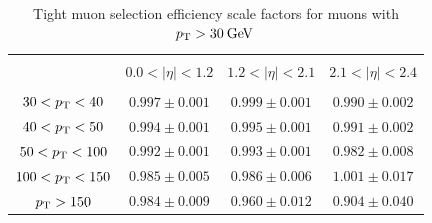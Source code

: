  \begin{table}[!ht]
 \centering
 \begin{tabular}{|c|c|c|c|}
 \hline
 &                          &                              &                           \\
 & $0.0 < |\eta| < 1.2$ & $1.2 < |\eta| < 2.1$ & $2.1 < |\eta| < 2.4$ \\
  &                          &                              &                           \\
 \hline
 $30 < p_\mathrm{T} <  40$ &  $0.997 \pm  0.001$  &  $0.999 \pm  0.001$  &  $0.990 \pm  0.002$ \\
 \hline
 $40 < p_\mathrm{T} <  50$ &  $0.994 \pm  0.001$  &  $0.995 \pm  0.001$  &  $0.991 \pm  0.002$ \\
 \hline
 $50 < p_\mathrm{T} < 100$ &  $0.992 \pm  0.001$  &  $0.993 \pm  0.001$  &  $0.982 \pm  0.008$ \\
\hline
$100 < p_\mathrm{T} < 150 $&  $0.985 \pm  0.005$  &  $0.986 \pm  0.006$  &  $1.001 \pm  0.017$ \\
 \hline
  $    p_\mathrm{T} > 150$ &  $0.984 \pm  0.009$  &  $0.960 \pm  0.012$  &  $0.904 \pm  0.040$ \\
\hline
\end{tabular}
\caption{Tight muon selection efficiency scale factors for muons with $p_\mathrm{T}>30\:\mathrm{Ge\kern -0.1em V}\:$}
\label{tab:mutight_sf}
\end{table}

